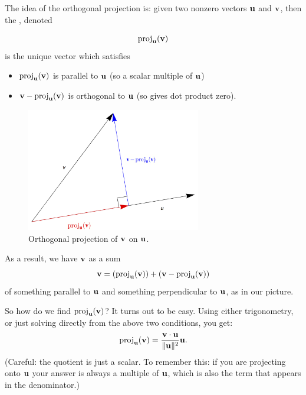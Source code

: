 The idea of the 
orthogonal projection is:  given two nonzero vectors $\mathbf{u}$ and $\mathbf{v}$,
then the , denoted

  
$$
 \operatorname{proj}_{\mathbf{u}}(\mathbf{v})
$$ 
is the unique vector which satisfies
\begin{itemize}\label{propOrthogProj}
\item $\operatorname{proj}_{\mathbf{u}}(\mathbf{v})$ is parallel to  
$\mathbf{u}$ (so a scalar multiple of $\mathbf{u}$)
\item $\mathbf{v} - \operatorname{proj}_{\mathbf{u}}(\mathbf{v})$ is orthogonal to $\mathbf{u}$ (so gives dot product zero).
\end{itemize}
 
\begin{figure}
\begin{center}
\includegraphics[width=3in]{img/decomp.jpg}
\end{center}
\caption{Orthogonal projection of $\mathbf{v}$ on $\mathbf{u}$.}\label{orthoprojonvector}
\end{figure}
As a result, we have  $\mathbf{v}$ as a sum
$$
\mathbf{v} = (\operatorname{proj}_{\mathbf{u}}(\mathbf{v}))+ (\mathbf{v}-\operatorname{proj}_{\mathbf{u}}(\mathbf{v}))
$$
of something parallel to $\mathbf{u}$ and something perpendicular to $\mathbf{u}$,
as in our picture.

So how do we find $\operatorname{proj}_{\mathbf{u}}(\mathbf{v})$?  It turns out to be easy.
Using either trigonometry, or just solving directly from the above
two conditions, you get:
$$
\operatorname{proj}_{\mathbf{u}}(\mathbf{v}) = \frac{\mathbf{v} \cdot \mathbf{u}}{\Vert \mathbf{u} \Vert^2} \mathbf{u}.
$$\label{projR3}
(Careful: the quotient is just a scalar.  To remember this:
if you are projecting
onto $\mathbf{u}$ your answer is always a multiple of $\mathbf{u}$, which is
also the term that appears in the denominator.) 


